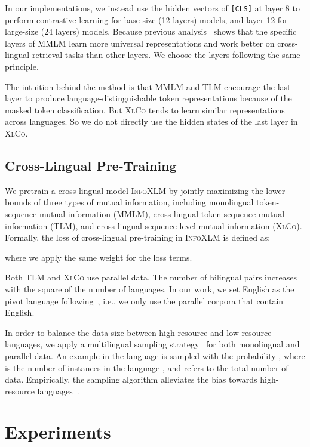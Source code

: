 \documentclass[11pt,a4paper]{article}
\newcommand{\sptk}[1]{\texttt{[#1]}}
\newcommand\our{\textsc{InfoXLM}}
\newcommand\xlco{\textsc{XlCo}}
\begin{document}
In our implementations, we instead use the hidden vectors of \sptk{CLS} at layer 8 to perform contrastive learning for base-size (12 layers) models, and layer 12 for large-size (24 layers) models.
Because previous analysis~\cite{sabet2020simalign,elements:mbert,emerging:xlm:acl20} shows that the specific layers of MMLM learn more universal representations and work better on cross-lingual retrieval tasks than other layers.
We choose the layers following the same principle.

The intuition behind the method is that MMLM and TLM encourage the last layer to produce language-distinguishable token representations because of the masked token classification.
But \xlco{} tends to learn similar representations across languages.
So we do not directly use the hidden states of the last layer in \xlco{}.


\subsection{Cross-Lingual Pre-Training}

We pretrain a cross-lingual model \our{} by jointly maximizing the lower bounds of three types of mutual information, including monolingual token-sequence mutual information (MMLM), cross-lingual token-sequence mutual information (TLM), and cross-lingual sequence-level mutual information (\xlco{}).
Formally, the loss of cross-lingual pre-training in \our{} is defined as:

where we apply the same weight for the loss terms.

Both TLM and \xlco{} use parallel data.
The number of bilingual pairs increases with the square of the number of languages.
In our work, we set English as the pivot language following~\cite{xlm}, i.e., we only use the parallel corpora that contain English.

In order to balance the data size between high-resource and low-resource languages, we apply a multilingual sampling strategy~\cite{xlm} for both monolingual and parallel data.
An example in the language  is sampled with the probability , where  is the number of instances in the language , and  refers to the total number of data.
Empirically, the sampling algorithm alleviates the bias towards high-resource languages~\cite{xlmr}.


\section{Experiments}
\label{sec:exp}
\end{document}
